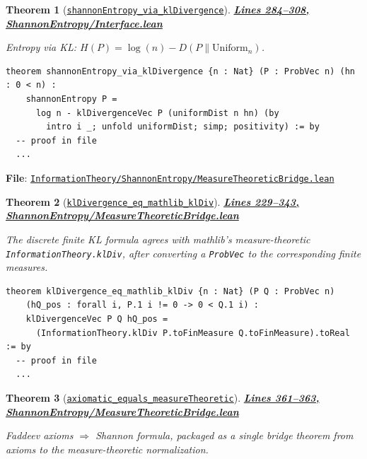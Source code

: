 \documentclass[11pt]{article}
\newtheorem{theorem}{Theorem}[section]
\theoremstyle{definition}
\theoremstyle{remark}
\begin{document}
\begin{theorem}[\href{https://github.com/zariuq/MeTTapedia/blob/main/lean/mettapedia/Mettapedia/InformationTheory/ShannonEntropy/Interface.lean\#L285}{\texttt{shannonEntropy\_via\_klDivergence}}]
\textbf{\href{https://github.com/zariuq/MeTTapedia/blob/main/lean/mettapedia/Mettapedia/InformationTheory/ShannonEntropy/Interface.lean\#L284-L308}{Lines 284--308, ShannonEntropy/Interface.lean}}

Entropy via KL: $H(P) = \log(n) - D(P \| \mathrm{Uniform}_n)$.
\end{theorem}

\begin{lstlisting}[caption={Entropy via KL (finite)}]
theorem shannonEntropy_via_klDivergence {n : Nat} (P : ProbVec n) (hn : 0 < n) :
    shannonEntropy P =
      log n - klDivergenceVec P (uniformDist n hn) (by
        intro i _; unfold uniformDist; simp; positivity) := by
  -- proof in file
  ...
\end{lstlisting}

\textbf{File}: \href{https://github.com/zariuq/MeTTapedia/blob/main/lean/mettapedia/Mettapedia/InformationTheory/ShannonEntropy/MeasureTheoreticBridge.lean}{\texttt{InformationTheory/ShannonEntropy/MeasureTheoreticBridge.lean}}

\begin{theorem}[\href{https://github.com/zariuq/MeTTapedia/blob/main/lean/mettapedia/Mettapedia/InformationTheory/ShannonEntropy/MeasureTheoreticBridge.lean\#L236}{\texttt{klDivergence\_eq\_mathlib\_klDiv}}]
\textbf{\href{https://github.com/zariuq/MeTTapedia/blob/main/lean/mettapedia/Mettapedia/InformationTheory/ShannonEntropy/MeasureTheoreticBridge.lean\#L229-L343}{Lines 229--343, ShannonEntropy/MeasureTheoreticBridge.lean}}

The discrete finite KL formula agrees with mathlib's measure-theoretic \texttt{InformationTheory.klDiv},
after converting a \texttt{ProbVec} to the corresponding finite measures.
\end{theorem}

\begin{lstlisting}[caption={Discrete KL equals mathlib klDiv (finite case)}]
theorem klDivergence_eq_mathlib_klDiv {n : Nat} (P Q : ProbVec n)
    (hQ_pos : forall i, P.1 i != 0 -> 0 < Q.1 i) :
    klDivergenceVec P Q hQ_pos =
      (InformationTheory.klDiv P.toFinMeasure Q.toFinMeasure).toReal := by
  -- proof in file
  ...
\end{lstlisting}

\begin{theorem}[\href{https://github.com/zariuq/MeTTapedia/blob/main/lean/mettapedia/Mettapedia/InformationTheory/ShannonEntropy/MeasureTheoreticBridge.lean\#L361}{\texttt{axiomatic\_equals\_measureTheoretic}}]
\textbf{\href{https://github.com/zariuq/MeTTapedia/blob/main/lean/mettapedia/Mettapedia/InformationTheory/ShannonEntropy/MeasureTheoreticBridge.lean\#L361-L363}{Lines 361--363, ShannonEntropy/MeasureTheoreticBridge.lean}}

Faddeev axioms $\Rightarrow$ Shannon formula, packaged as a single bridge theorem from axioms to the
measure-theoretic normalization.
\end{theorem}
\end{document}
